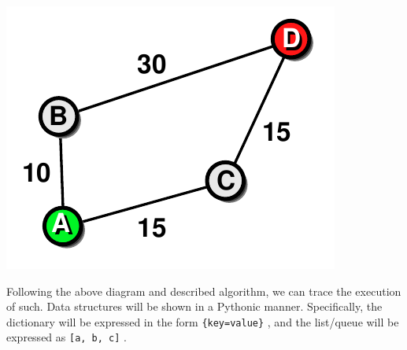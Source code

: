 \documentclass[letterpaper, 12pt]{article}
\begin{document}
\begin{multicols}{2}
\includegraphics[width=\columnwidth]{img/dijksra.pdf}

\newcommand{\pydict}[1]{\texttt{\{#1\}}}
\newcommand{\pylist}[1]{\texttt{[#1]}}
\newcommand{\pyinf}{\(\mathtt{\infty}\)}

Following the above diagram and described algorithm, we can trace the execution
of such. Data structures will be shown in a Pythonic manner. Specifically, the
dictionary will be expressed in the form \pydict{key=value} \cite{pydicts}, and
the list/queue will be expressed as \pylist{a, b, c} \cite{pylists}.


\end{multicols}
\end{document}
